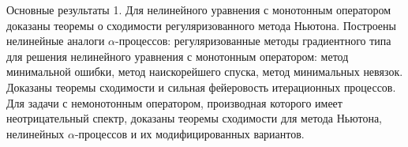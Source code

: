 \documentclass[10pt,pdf, mathserif, hyperref={unicode}]{beamer}
\begin{document}

\begin{frame}{Основные результаты}
	1. Для нелинейного уравнения с монотонным оператором доказаны теоремы о сходимости регуляризованного метода Ньютона. 
	Построены нелинейные аналоги $\alpha$-процессов:  регуляризованные методы градиентного типа для решения нелинейного уравнения с монотонным оператором: метод минимальной ошибки, метод наискорейшего спуска, метод минимальных невязок. Доказаны теоремы сходимости и сильная фейеровость итерационных процессов. Для задачи с немонотонным оператором, производная которого имеет неотрицательный спектр, доказаны теоремы сходимости для метода  Ньютона, нелинейных $\alpha$-процессов и их модифицированных вариантов.
	  
	
\end{frame}
\end{document}
